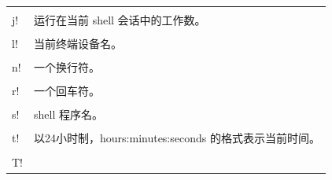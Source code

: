 \documentclass[doctor,openright,twoside]{sjtuthesis}
\newcommand{\passthrough}[1]{#1}
\theoremstyle{plain}
\theoremstyle{definition}
\theoremstyle{remark}
\theoremstyle{ocrenumbox}
\theoremstyle{plain}
\begin{document}
\begin{longtable}[]{@{}ll@{}}
\begin{minipage}[t]{0.22\columnwidth}\raggedright
\passthrough{\lstinline!\\j!}\strut
\end{minipage} & \begin{minipage}[t]{0.72\columnwidth}\raggedright
运行在当前 shell 会话中的工作数。\strut
\end{minipage}\tabularnewline
\begin{minipage}[t]{0.22\columnwidth}\raggedright
\passthrough{\lstinline!\\l!}\strut
\end{minipage} & \begin{minipage}[t]{0.72\columnwidth}\raggedright
当前终端设备名。\strut
\end{minipage}\tabularnewline
\begin{minipage}[t]{0.22\columnwidth}\raggedright
\passthrough{\lstinline!\\n!}\strut
\end{minipage} & \begin{minipage}[t]{0.72\columnwidth}\raggedright
一个换行符。\strut
\end{minipage}\tabularnewline
\begin{minipage}[t]{0.22\columnwidth}\raggedright
\passthrough{\lstinline!\\r!}\strut
\end{minipage} & \begin{minipage}[t]{0.72\columnwidth}\raggedright
一个回车符。\strut
\end{minipage}\tabularnewline
\begin{minipage}[t]{0.22\columnwidth}\raggedright
\passthrough{\lstinline!\\s!}\strut
\end{minipage} & \begin{minipage}[t]{0.72\columnwidth}\raggedright
shell 程序名。\strut
\end{minipage}\tabularnewline
\begin{minipage}[t]{0.22\columnwidth}\raggedright
\passthrough{\lstinline!\\t!}\strut
\end{minipage} & \begin{minipage}[t]{0.72\columnwidth}\raggedright
以24小时制，hours:minutes:seconds 的格式表示当前时间。\strut
\end{minipage}\tabularnewline
\begin{minipage}[t]{0.22\columnwidth}\raggedright
\passthrough{\lstinline!\\T!}\strut

\end{minipage}
\end{longtable}
\end{document}
